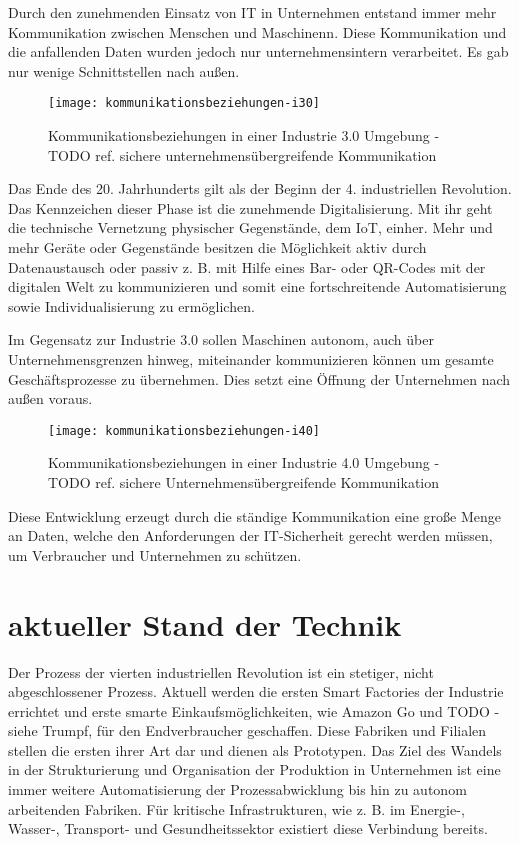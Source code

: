 Durch den zunehmenden Einsatz von IT in Unternehmen entstand immer mehr Kommunikation zwischen Menschen und Maschinenn. Diese Kommunikation und die anfallenden Daten wurden jedoch nur unternehmensintern verarbeitet. Es gab nur wenige Schnittstellen nach außen.

\begin{figure}[h]
  \centering
  \texttt{[image: kommunikationsbeziehungen-i30]}
  \caption{Kommunikationsbeziehungen in einer Industrie 3.0 Umgebung - TODO ref. sichere unternehmensübergreifende Kommunikation}
  \label{Kap2:Industrie3.0-Kommunikation}
\end{figure}

\clearpage

Das Ende des 20. Jahrhunderts gilt als der Beginn der 4. industriellen Revolution. Das Kennzeichen dieser Phase ist die zunehmende Digitalisierung. Mit ihr geht die technische Vernetzung physischer Gegenstände, dem \ac{IoT}, einher. Mehr und mehr Geräte oder Gegenstände besitzen die Möglichkeit aktiv durch Datenaustausch oder passiv z. B. mit Hilfe eines Bar- oder QR-Codes mit der digitalen Welt zu kommunizieren und somit eine fortschreitende Automatisierung sowie Individualisierung zu ermöglichen. 

Im Gegensatz zur Industrie 3.0 sollen Maschinen autonom, auch über Unternehmensgrenzen hinweg, miteinander kommunizieren können um gesamte Geschäftsprozesse zu übernehmen. Dies setzt eine Öffnung der Unternehmen nach außen voraus.

\begin{figure}[h]
  \centering
  \texttt{[image: kommunikationsbeziehungen-i40]}
  \caption{Kommunikationsbeziehungen in einer Industrie 4.0 Umgebung - TODO ref. sichere Unternehmensübergreifende Kommunikation}
  \label{Kap2:Industrie4.0-Kommunikation}
\end{figure}

\clearpage

Diese Entwicklung erzeugt durch die ständige Kommunikation eine große Menge an Daten, welche den Anforderungen der IT-Sicherheit gerecht werden müssen, um Verbraucher und Unternehmen zu schützen.

\section{aktueller Stand der Technik}
Der Prozess der vierten industriellen Revolution ist ein stetiger, nicht abgeschlossener Prozess. Aktuell werden die ersten Smart Factories der Industrie errichtet und erste smarte Einkaufsmöglichkeiten, wie Amazon Go und TODO - siehe Trumpf, für den Endverbraucher geschaffen. Diese Fabriken und Filialen stellen die ersten ihrer Art dar und dienen als Prototypen. Das Ziel des Wandels in der Strukturierung und Organisation der Produktion in Unternehmen ist eine immer weitere Automatisierung der Prozessabwicklung bis hin zu autonom arbeitenden Fabriken. Für kritische Infrastrukturen, wie z. B. im Energie-, Wasser-, Transport- und Gesundheitssektor existiert diese Verbindung bereits.

